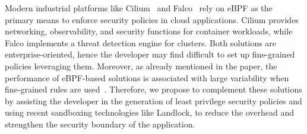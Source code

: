 Modern industrial platforms like Cilium~\cite{cilium} and
Falco~\cite{falco} rely on eBPF as the primary means to enforce
security policies in cloud applications. Cilium provides networking,
observability, and security functions for container workloads, while
Falco implements a threat detection engine for clusters. Both
solutions are enterprise-oriented, hence the developer may find
difficult to set up fine-grained policies leveraging them. Moreover,
as already mentioned in the paper, the performance of eBPF-based
solutions is associated with large variability when fine-grained rules
are used~\cite{falco-overhead}. Therefore, we propose to complement
these solutions by assisting the developer in the generation of least
privilege security policies and using recent sandboxing technologies
like Landlock, to reduce the overhead and strengthen the security
boundary of the application.

